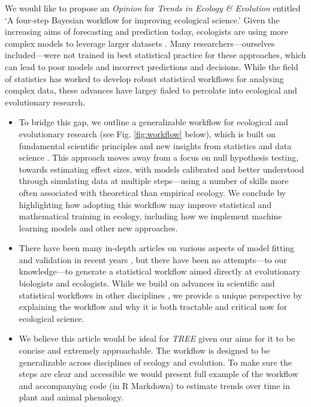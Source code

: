 \documentclass[11pt]{article}
\begin{document}
We would like to propose an \emph{Opinion} for \emph{Trends in Ecology \& Evolution} entitled `A four-step Bayesian workflow for improving ecological science.' %
Given the increasing aims of forecasting and prediction today, ecologists are using more complex models to leverage larger datasets \citep{anderson2021trends,muff2022rewriting}. Many researchers---ourselves included---were not trained in best statistical practice for these approaches, which can lead to poor models and incorrect predictions and decisions. While the field of statistics has worked to develop robust statistical workflows for analysing complex data, these advances have largey fialed to percolate into ecological and evolutionary research.%
\begin{itemize}
\item To bridge this gap, we outline a generalizable workflow for ecological and evolutionary research (see Fig. \ref{fig:workflow} below), which is built on fundamental scientific principles and new insights from statistics and data science \citep[][]{grinsztajn2021,vandeschoot2021}. This approach  moves away from a focus on null hypothesis testing, towards estimating effect sizes, with models calibrated and better understood through simulating data at multiple steps---using a number of skills more often associated with theoretical than empirical ecology. We conclude by highlighting how adopting this workflow may improve statistical and mathematical training in ecology, including how we implement machine learning models and other new approaches. 
\item There have been many in-depth articles on various aspects of model fitting and validation in recent years \citep[e.g.][]{conn2018,gabryvis,tredennick2021practical,direnzo2023practical}, but there have been no attempts---to our knowledge---to generate a statistical workflow aimed directly at evolutionary biologists and ecologists. While we build on advances in scientific and statistical workflows in other disciplines \citep{gelman2020bayesian,grinsztajn2021,schad2021}, we provide a unique perspective by explaining the workflow and why it is both tractable and critical now for ecological science. 
\item We believe this article would be ideal for \emph{TREE} given our aims for it to be concise and extremely approachable. The workflow is designed to be generalizable across disciplines of ecology and evolution. To make sure the steps are clear and accessible we would present full example of the workflow and accompanying code (in R Markdown) to estimate trends over time in plant and animal phenology. 
\end{itemize}
\end{document}
